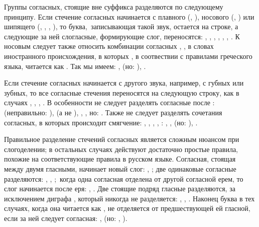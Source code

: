 \documentclass[12pt,a4paper,oneside]{extarticle}
\begin{document}
Группы согласных, стоящие вне суффикса разделяются по следующему принципу. Если стечение согласных начинается с плавного (, ), носового (, ) или шипящего (, , , ), то буква, записывающая такой звук, остается на строке, а следующие за ней слогласные, формирующие слог, переносятся: , , , , , , . К носовым следует также относить комбинации согласных , ,  в словах иностранного происхождения, в которых , в соотвествии с правилами греческого языка, читается как . Так мы имеем: ,  (но: ), .

Если стечение согласных начинается с другого звука, например, с губных или зубных, то все согласные стечения переносятся на следующую строку, как в случаях , , , . В особенности не следует разделять согласные после :  (неправильно: ),  (а не ), , , но: . Также не следует разделять сочетания согласных, в которых происходит смягчение: , , , , : , ,  (но: ), .

Правильное разделение стечений согласных является сложным нюансом при слогоделении; в остальных случаях действуют достаточно простые правила, похожие на соответствующие правила в русском языке. Согласная, стоящая между двумя гласными, начинает новый слог: , ; две одинаковые согласные разделяются: , , ; когда одна согласная отделена от другой согласной ерем, то слог начинается после еря: , . Две стоящие подряд гласные разделяются, за исключением диграфа , который никогда не разделяется: , , . Наконец буква  в тех случаях, когда она читается как , не отделяется от предшествующей ей гласной, если за ней следует согласная: ,  (но: , ).
\end{document}
